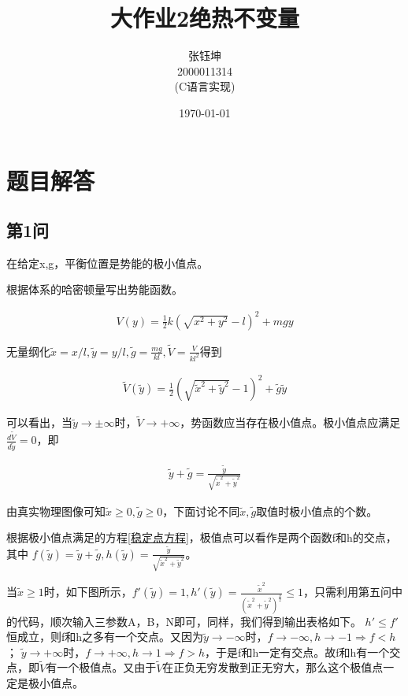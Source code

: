 \documentclass[10pt, a4paper]{article}
\title{\heiti 大作业2\phantom{   }绝热不变量}
\author{ 张钰坤 \\  2000011314 \\(C语言实现)}
\date{\today}
\newcommand{\wx}{\widetilde{x}}
\newcommand{\wy}{\widetilde{y}}
\newcommand{\wg}{\widetilde{g}}
\newcommand{\wV}{\widetilde{V}}
\begin{document}
    \maketitle
    \tableofcontents
    \newpage

    \section{题目解答}
    \subsection{第1问}

    在给定x,g，平衡位置是势能的极小值点。

    根据体系的哈密顿量写出势能函数。

    \begin{align}
        V(y)=\frac{1}{2}k(\sqrt{x^2+y^2}-l)^2+mgy
    \end{align}

    无量纲化$ \wx =x/l, \wy=y/l,\wg=\frac{mg}{kl},\wV=\frac{V}{kl^2}$得到

    \begin{align}
        \wV(\wy)=\frac{1}{2}(\sqrt{\wx^2+\wy^2}-1)^2+\wg\wy
    \end{align}

    可以看出，当$\wy\to\pm\infty$时，$\wV\to+\infty$，势函数应当存在极小值点。极小值点应满足$\frac{d\wV}{d\wy}=0$，即

    \begin{align}
        \wy+\wg=\frac{\wy}{\sqrt{\wx^2+\wy^2}}
    \end{align}\label{稳定点方程}

    由真实物理图像可知$\wx\ge0,\wg\ge0$，下面讨论不同$\wx,\wg$取值时极小值点的个数。

    根据极小值点满足的方程\ref{稳定点方程}，极值点可以看作是两个函数f和h的交点，其中
    $f(\wy)=\wy+\wg,h(\wy)=\frac{\wy}{\sqrt{\wx^2+\wy^2}}$。

    当$\wx\ge1$时，如下图所示，$f'(\wy)=1,h'(\wy)=\frac{\wx^2}{(\wx^2+\wy^2)^\frac{3}{2}}\le1$，只需利用第五问中的代码，顺次输入三参数A，B，N即可，同样，我们得到输出表格如下。
    $h'\le f'$恒成立，则f和h之多有一个交点。又因为$\wy\to-\infty$时，$f\to-\infty,h\to-1\Rightarrow f<h$；
    $\wy\to+\infty$时，$f\to+\infty,h\to1\Rightarrow f>h$，于是f和h一定有交点。故f和h有一个交点，即$\wV$有一个极值点。又由于$\wV$在正负无穷发散到正无穷大，那么这个极值点一定是极小值点。
    
\end{document}

